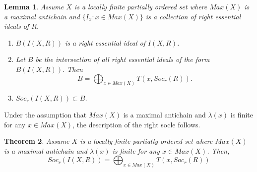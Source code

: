 \documentclass[12pt]{article}
\newtheorem{theorem}{Theorem}[subsection]
\newtheorem{lemma}[theorem]{Lemma}
\begin{document}
\begin{lemma}
\label{B(I)} Assume $X$ is a locally finite partially ordered set where $%
Max(X)$ is a maximal antichain and $\{I_x : x \in Max(X)\}$ is a collection
of right essential ideals of $R$.

\begin{enumerate}
\item $B({I(X,R)})$ is a right essential ideal of ${I(X,R)}$.

\item Let $B$ be the intersection of all right essential ideals of the form $%
B({I(X,R)})$. Then 
\begin{equation*}
B = \bigoplus_{x \in Max(X)} T(x,Soc_r(R)).
\end{equation*}

\item $Soc_r({I(X,R)}) \subset B$.
\end{enumerate}
\end{lemma}


\medskip 

Under the assumption that $Max(X)$ is a maximal antichain and $\lambda(x)$
is finite for any $x \in Max(X)$, the description of the right socle follows.

\begin{theorem}
\label{MaxSocle} Assume $X$ is a locally finite partially ordered set where $%
Max(X)$ is a maximal antichain and $\lambda(x)$ is finite for any $x \in
Max(X)$. Then, 
\begin{equation*}
Soc_r({I(X,R)}) = \bigoplus_{x \in Max(X)} T(x,Soc_r(R))
\end{equation*}
\end{theorem}
\end{document}
